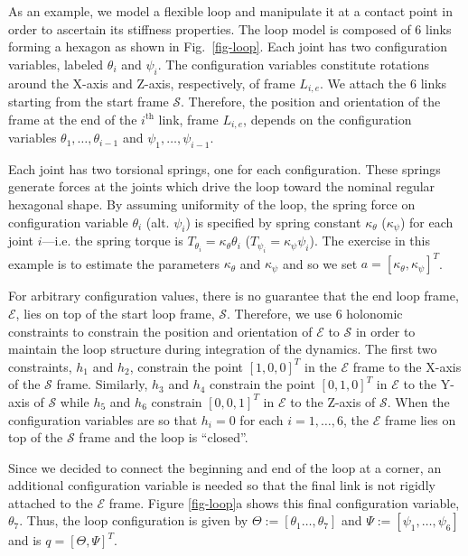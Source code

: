 \documentclass[letterpaper, 10pt, conference]{ieeeconf}
\begin{document}
As an example, we model a flexible loop and manipulate it at a contact point in order to ascertain its stiffness properties.  The loop model is composed of 6 links forming a hexagon as shown in Fig.~\ref{fig-loop}.  Each joint has two configuration variables, labeled $\theta_i$ and $\psi_i$.  The configuration variables constitute rotations around the X-axis and Z-axis, respectively, of frame $L_{i,e}$.  We attach the 6 links starting from the start frame $\mathcal{S}$.  Therefore, the position and orientation of the frame at the end of the $i^\textrm{th}$ link, frame $L_{i,e}$, depends on the configuration variables $\theta_1,\ldots,\theta_{i-1}$ and $\psi_1,\ldots,\psi_{i-1}$.  

Each joint has two torsional springs, one for each configuration.  These springs generate forces at the joints which drive the loop toward the nominal regular hexagonal shape.  By assuming uniformity of the loop, the spring force on configuration variable $\theta_i$ (alt. $\psi_i$) is specified by spring constant $\kappa_{\theta}$ ($\kappa_{\psi}$) for each joint $i$---i.e. the spring torque is $T_{\theta_i} = \kappa_{\theta}\theta_i$ ($T_{\psi_i} = \kappa_{\psi}\psi_i$).  The exercise in this example is to estimate the parameters $\kappa_{\theta}$ and $\kappa_{\psi}$ and so we set $a = [\kappa_{\theta},\kappa_{\psi}]^T$.  

For arbitrary configuration values, there is no guarantee that the end loop frame, $\mathcal{E}$, lies on top of the start loop frame, $\mathcal{S}$. Therefore, we use 6 holonomic constraints to constrain the position and orientation of $\mathcal{E}$ to $\mathcal{S}$ in order to maintain the loop structure during integration of the dynamics.  The first two constraints, $h_1$ and $h_2$, constrain the point $[1, 0, 0]^T$ in the $\mathcal{E}$ frame to the X-axis of the $\mathcal{S}$ frame. Similarly, $h_3$ and $h_4$ constrain the point $[0,1,0]^T$ in $\mathcal{E}$ to the Y-axis of $\mathcal{S}$ while $h_5$ and $h_6$ constrain $[0,0,1]^T$ in $\mathcal{E}$ to the Z-axis of $\mathcal{S}$.  When the configuration variables are so that $h_i = 0$ for each $i = 1,\ldots,6$, the $\mathcal{E}$ frame lies on top of the $\mathcal{S}$ frame and the loop is ``closed''. 

Since we decided to connect the beginning and end of the loop at a corner, an additional configuration variable is needed so that the final link is not rigidly attached to the $\mathcal{E}$ frame.  Figure \ref{fig-loop}a shows this final configuration variable, $\theta_7$.  Thus, the loop configuration is given by $\Theta:=[\theta_1\ldots,\theta_7]$ and $\Psi:=[\psi_1,\ldots,\psi_6]$ and is $q = [\Theta,\Psi]^T$.  
\end{document}
